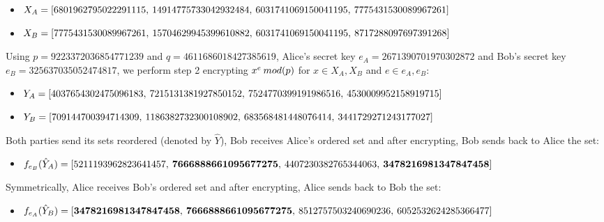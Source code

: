 \begin{itemize}
    \item $X_A = [ 6801962795022291115, \hspace*{.2 em} 14914775733042932484, \hspace*{.2 em}  6031741069150041195, \hspace*{.2 em} 7775431530089967261] $
    \item $X_B = [ 7775431530089967261, \hspace*{.2 em}  15704629945399610882, \hspace*{.2 em}   6031741069150041195, \hspace*{.2 em} 8717288097697391268]$
\end{itemize}

Using $p=9223372036854771239$ and $q=4611686018427385619$, Alice's secret key $e_A = 2671390701970302872$ and Bob's secret key $e_B = 325637035052474817$, we perform step 2 encrypting $x^{e} \hspace*{0.2 em} mod(p)$ for $x \in X_A, X_B$ and $e \in e_A, e_B$:

\begin{itemize}
    \item $Y_A = [4037654302475096183, \hspace*{.2 em} 7215131381927850152, \hspace*{.2 em}  7524770399191986516, \hspace*{.2 em} 4530009952158919715]$
    \item $Y_B = [ 709144700394714309, \hspace*{.2 em} 1186382732300108902, \hspace*{.2 em}  683568481448076414, \hspace*{.2 em} 3441729271243177027]$
\end{itemize}

Both parties send its sets reordered (denoted by $\hat{Y}$), Bob receives Alice's ordered set and after encrypting, Bob sends back to Alice the set:

\begin{itemize}
    \item $f_{e_B}(\hat{Y}_A) = [5211193962823641457, \hspace*{.2 em} \mathbf{7666888661095677275}, \hspace*{.2 em} 4407230382765344063, \hspace*{.2 em} \mathbf{3478216981347847458}]$
\end{itemize}

Symmetrically, Alice receives Bob's ordered set and after encrypting, Alice sends back to Bob the set:
\begin{itemize}
    \item $f_{e_A}(\hat{Y}_B) = [\mathbf{3478216981347847458},\hspace*{.2 em} \mathbf{7666888661095677275}, \hspace*{.2 em} 8512757503240690236, \hspace*{.2 em} 6052532624285366477]$
\end{itemize}

